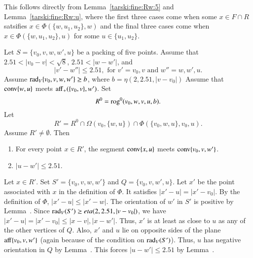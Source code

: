 \begin{tarskidata}
\begin{tarski}
\begin{proved}  This follows directly from Lemma~\ref{tarski:fine:Rw:5}
and Lemma~\ref{tarski:fine:Rw:u}, where the first three cases
come when some $x\in F\cap R$ satsifies
  $x\in\Phi(\{w,u_1,u_2\},w)$ and the final three cases
come when $x\in\Phi(\{w,u_1,u_2\},u)$ for some $u\in \{u_1,u_2\}$.
\swallowed\end{proved}
\end{tarski}






\begin{tarski}

\begin{lemma}
Let $S=\{v_0,v,w,w',u\}$ be a packing of five points.
Assume that $2.51<|v_0-v|<\sqrt8$, $2.51<|w-w'|$, and
  $$
  |v'-w''| \le 2.51, \text{ for } v'=v_0,v \text{ and } w''=w,w',u.
  $$
Assume $\operatorname{rad}_V\{v_0,v,w,w'\}\ge b$, where $b=\eta(2,2.51,|v-v_0|)$
Assume that ${\operatorname{conv}}\{w,u\}$ meets ${\operatorname{aff}}_+(\{v_0,v\},w')$.
Set
  $$R^0={\operatorname{rog}}^0(v_0,w,v,u,b).$$
Let 
   $$R' = R^0 \cap\Omega(v_0,\{w,u\})\cap
     \Phi(\{v_0,w,u\},v_0,u).$$
Assume $R'\ne \emptyset$.
Then
\begin{enumerate}
 \item  For every point $x\in R'$, the segment ${\operatorname{conv}}\{x,u\}$ meets
  ${\operatorname{conv}}\{v_0,v,w'\}$.
\item $|u-w'|\le 2.51$.
\end{enumerate}
\end{lemma}

\begin{proved} 
Let $x\in R'$. Set $S'=\{v_0,v,w,w'\}$ and $Q=\{v_0,v,w',u\}$.
Let $x'$ be the point associated with $x$ in the definition of $\Phi$.  It satisfies
 $|x'-u|=|x'-v_0|$.  By the definition of $\Phi$,
$|x'-u| \le |x'-w|$.  The orientation of $w'$ in $S'$ is positive by Lemma~.
Since $\operatorname{rad}_V(S')\ge eta(2,2.51,|v-v_0|)$, we have
$|x'-u|=|x'-v_0| \le |x-v|,|x-w'|$.  Thus, $x'$ is at least as close to $u$
as any of the other vertices of $Q$.  Also, $x'$
and $u$ lie on opposite sides of the plane ${\operatorname{aff}}\{v_0,v,w'\}$
(again because of the condition on $\operatorname{rad}_V(S')$).  Thus, $u$ has
negative orientation in $Q$ by Lemma~.  This forces 
$|u-w'|\le 2.51$ by Lemma~.


\end{proved}
\end{tarski}
\end{tarskidata}
